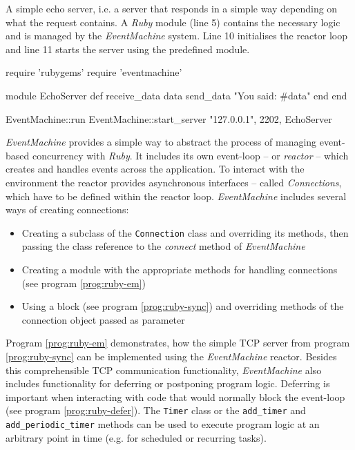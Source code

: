 \begin{program}
  \caption{A simple echo server, i.e. a server that responds in a simple way depending on what the request contains. A \textit{Ruby} module (line 5) contains the necessary logic and is managed by the \textit{EventMachine} system. Line 10 initialises the reactor loop and line 11 starts the server using the predefined module.}
  \label{prog:ruby-em}
  \begin{JavaCode}
require 'rubygems'
require 'eventmachine'

module EchoServer
    def receive_data data
        send_data "You said: #{data}"
    end
end

EventMachine::run {
    EventMachine::start_server "127.0.0.1", 2202, EchoServer
}
  \end{JavaCode}
\end{program}

\textit{EventMachine} provides a simple way to abstract the process of managing event-based concurrency with \textit{Ruby}. It includes its own event-loop -- or \textit{reactor} -- which creates and handles events across the application. To interact with the environment the reactor provides asynchronous interfaces -- called \textit{Connections}, which have to be defined within the reactor loop. \textit{EventMachine} includes several ways of creating connections:

\begin{itemize}
  \item Creating a subclass of the \texttt{Connection} class and overriding its methods, then passing the class reference to the \textit{connect} method of \textit{EventMachine}
  \item Creating a module with the appropriate methods for handling connections (see program \ref{prog:ruby-em})
  \item Using a block (see program \ref{prog:ruby-sync}) and overriding methods of the connection object passed as parameter
\end{itemize}
Program \ref{prog:ruby-em} demonstrates, how the simple TCP server from program \ref{prog:ruby-sync} can be implemented using the \textit{EventMachine} reactor. Besides this comprehensible TCP communication functionality, \textit{EventMachine} also includes functionality for deferring or postponing program logic. Deferring is important when interacting with code that would normally block the event-loop (see program \ref{prog:ruby-defer}). The \texttt{Timer} class or the \texttt{add\_timer} and \texttt{add\_periodic\_timer} methods can be used to execute program logic at an arbitrary point in time (e.g. for scheduled or recurring tasks).

